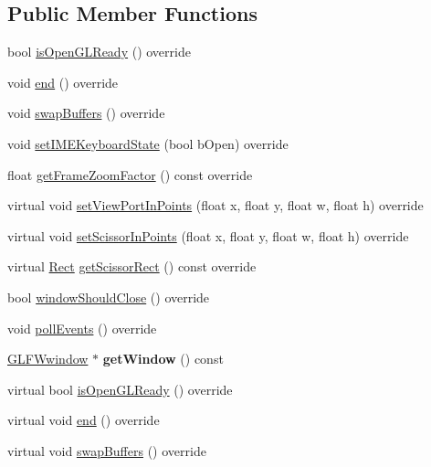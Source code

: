 \subsection*{Public Member Functions}
\begin{DoxyCompactItemize}
\item 
bool \hyperlink{classGLViewImpl_a037047e04b2070c1c6d874756a978a02}{is\+Open\+G\+L\+Ready} () override
\item 
void \hyperlink{classGLViewImpl_ab2d87c9a94b84691ed9ae4ca378745a8}{end} () override
\item 
void \hyperlink{classGLViewImpl_a29bbe397ac0cd3793fa0815b34cd37aa}{swap\+Buffers} () override
\item 
void \hyperlink{classGLViewImpl_a134389b64b11ebd0af740c9acba58dc9}{set\+I\+M\+E\+Keyboard\+State} (bool b\+Open) override
\item 
float \hyperlink{classGLViewImpl_a16f58cd2c122ecf8f3feb7bca6f4309d}{get\+Frame\+Zoom\+Factor} () const override
\item 
virtual void \hyperlink{classGLViewImpl_a137ba16cbdb6ce3877544f898d113f92}{set\+View\+Port\+In\+Points} (float x, float y, float w, float h) override
\item 
virtual void \hyperlink{classGLViewImpl_a76dc10b4cab007815628df12ac037bde}{set\+Scissor\+In\+Points} (float x, float y, float w, float h) override
\item 
virtual \hyperlink{classRect}{Rect} \hyperlink{classGLViewImpl_ada58319111ad3cca8b03ed92cfbf1bdf}{get\+Scissor\+Rect} () const override
\item 
bool \hyperlink{classGLViewImpl_a0d0a12b4bfa3656c9b24ca8b141f7b1e}{window\+Should\+Close} () override
\item 
void \hyperlink{classGLViewImpl_aafbe949f616506c1faeb090fe9456bcc}{poll\+Events} () override
\item 
\mbox{\label{classGLViewImpl_a8a9490bd68db4de3c3011d54f32f4acc}} 
\hyperlink{group__window_ga3c96d80d363e67d13a41b5d1821f3242}{G\+L\+F\+Wwindow} $\ast$ {\bfseries get\+Window} () const
\item 
virtual bool \hyperlink{classGLViewImpl_af539e58d1d28db65ba47f107c9c801d7}{is\+Open\+G\+L\+Ready} () override
\item 
virtual void \hyperlink{classGLViewImpl_ab5a08a3ea92598cdabbed94686eed58a}{end} () override
\item 
virtual void \hyperlink{classGLViewImpl_ab434675d26eb367ae74f9533c34d2ca7}{swap\+Buffers} () override

\end{DoxyCompactItemize}
